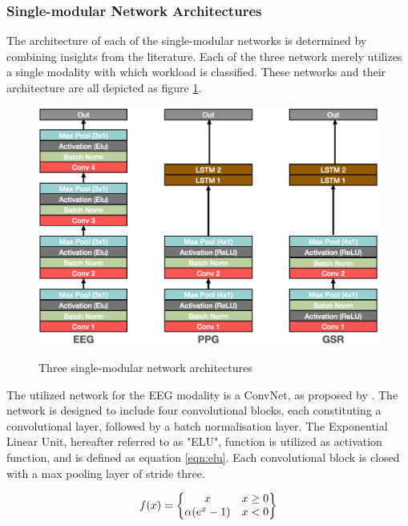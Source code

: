 \documentclass[12pt]{article}
\begin{document}
\subsubsection{Single-modular Network Architectures}
The architecture of each of the single-modular networks is determined by combining insights from the literature. Each of the three network merely utilizes a single modality with which workload is classified. These networks and their architecture are all depicted as figure \ref{fig:singlearchitecture}.

\begin{figure}
\caption{Three single-modular network architectures}
\bigskip
\includegraphics[scale=0.725]{single_model_architecture}
\label{fig:singlearchitecture}
\end{figure}

The utilized network for the EEG modality is a ConvNet, as proposed by . The network is designed to include four convolutional blocks, each constituting a convolutional layer, followed by a batch normalisation layer. The Exponential Linear Unit, hereafter referred to as "ELU", function is utilized as activation function, and is defined as equation \ref{eqn:elu}. Each convolutional block is closed with a max pooling layer of stride three.

\begin{equation}
\label{eqn:elu}
f(x)= 
\begin{Bmatrix}
x & x \geq0 \\ 
\alpha (e^x -1) & x<0
\end{Bmatrix}
\bigskip
\end{equation}
\end{document}
